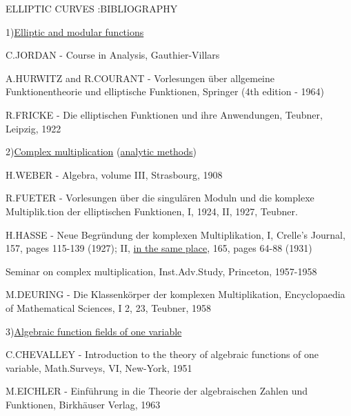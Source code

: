 \clearpage
{}
\reversemarginpar
{}
\normalmarginpar
{}

\begin{center}
ELLIPTIC CURVES :\quad BIBLIOGRAPHY
\end{center}

1)\quad \uline{Elliptic and modular functions}

C.JORDAN - Course in Analysis, Gauthier-Villars

A.HURWITZ and R.COURANT - Vorlesungen über allgemeine Funktionentheorie und elliptische Funktionen, Springer (4th edition - 1964)

R.FRICKE - Die elliptischen Funktionen und ihre Anwendungen, Teubner, Leipzig, 1922

2)\quad \uline{Complex multiplication} (\uline{analytic methods})

H.WEBER - Algebra, volume III, Strasbourg, 1908

R.FUETER - Vorlesungen über die singulären Moduln und die komplexe Multiplik.tion der elliptischen Funktionen, I, 1924, II, 1927, Teubner.

H.HASSE - Neue Begründung der komplexen Multiplikation, I, Crelle's Journal, 157, pages 115-139 (1927); II, \uline{in the same place}, 165, pages 64-88 (1931)

Seminar on complex multiplication, Inst.Adv.Study, Princeton, 1957-1958

M.DEURING - Die Klassenkörper der komplexen Multiplikation, Encyclopaedia of Mathematical Sciences, I 2, 23, Teubner, 1958

3)\quad \uline{Algebraic function fields of one variable}

C.CHEVALLEY - Introduction to the theory of algebraic functions of one variable, Math.Surveys, VI, New-York, 1951

M.EICHLER - Einführung in die Theorie der algebraischen Zahlen und Funktionen, Birkhäuser Verlag, 1963
